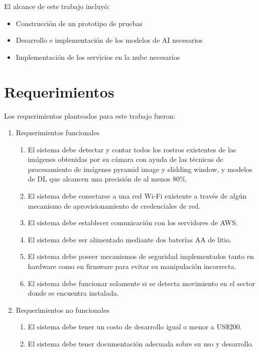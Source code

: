 El alcance de este trabajo incluyó:
\begin{itemize}
	\item Construcción de un prototipo de pruebas
	\item Desarrollo e implementación de los modelos de AI necesarios
	\item Implementación de los servicios en la nube necesarios
\end{itemize}
\section{Requerimientos}
Los requerimientos planteados para este trabajo fueron:
\begin{enumerate}
	\item Requerimientos funcionales
   \begin{enumerate}
      	\item El sistema debe detectar y contar todos los rostros existentes de las imágenes obtenidas por su cámara con ayuda de las técnicas de procesamiento de imágenes pyramid image y slidding window, y modelos de DL que alcancen una precisión de al menos 80\%.
		\item El sistema debe conectarse a una red Wi-Fi existente a través de algún mecanismo de aprovisionamiento de credenciales de red.
		\item El sistema debe establecer comunicación con los servidores de AWS.
		\item El sistema debe ser alimentado mediante dos baterías AA de litio.
		\item El sistema debe poseer mecanismos de seguridad implementados tanto en hardware como en firmware para evitar su manipulación incorrecta.
		\item El sistema debe funcionar solamente si se detecta movimiento en el sector donde se encuentra instalada.
	\end{enumerate}
	\item Requerimientos no funcionales
	\begin{enumerate}
		\item El sistema debe tener un costo de desarrollo igual o menor a US\$200.
		\item El sistema debe tener documentación adecuada sobre su uso y desarrollo.
	\end{enumerate}
\end{enumerate}





